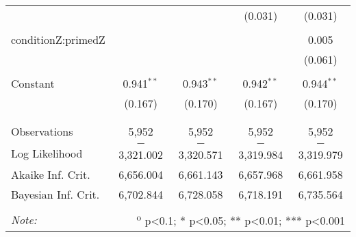 \begin{table}[!htbp]
\begin{tabular}{@{\extracolsep{5pt}}lcccc}
  &  &  & (0.031) & (0.031) \\ 
  & & & & \\ 
 conditionZ:primedZ &  &  &  & 0.005 \\ 
  &  &  &  & (0.061) \\ 
  & & & & \\ 
 Constant & 0.941$^{**}$ & 0.943$^{**}$ & 0.942$^{**}$ & 0.944$^{**}$ \\ 
  & (0.167) & (0.170) & (0.167) & (0.170) \\ 
  & & & & \\ 
\hline \\[-1.8ex] 
Observations & 5,952 & 5,952 & 5,952 & 5,952 \\ 
Log Likelihood & $-$3,321.002 & $-$3,320.571 & $-$3,319.984 & $-$3,319.979 \\ 
Akaike Inf. Crit. & 6,656.004 & 6,661.143 & 6,657.968 & 6,661.958 \\ 
Bayesian Inf. Crit. & 6,702.844 & 6,728.058 & 6,718.191 & 6,735.564 \\ 
\hline 
\hline \\[-1.8ex] 
\textit{Note:}  & \multicolumn{4}{r}{\textsuperscript{o} p<0.1; * p<0.05; ** p<0.01; *** p<0.001} \\ 
\end{tabular} 
\end{table} 
